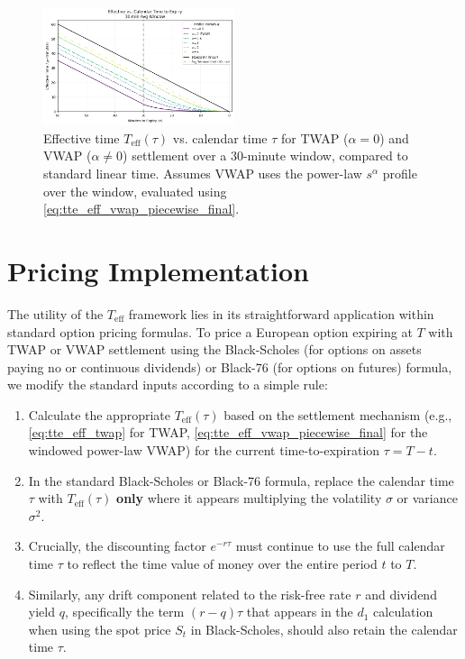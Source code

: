 \documentclass[11pt]{article}
\theoremstyle{plain}
\begin{document}
\begin{figure}[H]
    \centering
    \includegraphics[width=0.5\textwidth]{png1.png}
    \caption{Effective time $T_{\mathrm{eff}}(\tau)$ vs. calendar time $\tau$ for TWAP ($\alpha=0$) and VWAP ($\alpha \neq 0$) settlement over a 30-minute window, compared to standard linear time. Assumes VWAP uses the power-law $s^\alpha$ profile over the window, evaluated using \cref{eq:tte_eff_vwap_piecewise_final}.}
    \label{fig:Teff_vs_tau}
\end{figure}



\section{Pricing Implementation}
\label{sec:implementation}

The utility of the $T_{\mathrm{eff}}$ framework lies in its straightforward application within standard option pricing formulas. To price a European option expiring at $T$ with TWAP or VWAP settlement using the Black-Scholes (for options on assets paying no or continuous dividends) or Black-76 (for options on futures) formula, we modify the standard inputs according to a simple rule:

\begin{enumerate}
    \item Calculate the appropriate $T_{\mathrm{eff}}(\tau)$ based on the settlement mechanism (e.g., \cref{eq:tte_eff_twap} for TWAP, \cref{eq:tte_eff_vwap_piecewise_final} for the windowed power-law VWAP) for the current time-to-expiration $\tau = T-t$.
    \item In the standard Black-Scholes or Black-76 formula, replace the calendar time $\tau$ with $T_{\mathrm{eff}}(\tau)$ \textbf{only} where it appears multiplying the volatility $\sigma$ or variance $\sigma^2$.
    \item Crucially, the discounting factor $e^{-r\tau}$ must continue to use the full calendar time $\tau$ to reflect the time value of money over the entire period $t$ to $T$.
    \item Similarly, any drift component related to the risk-free rate $r$ and dividend yield $q$, specifically the term $(r-q)\tau$ that appears in the $d_1$ calculation when using the spot price $S_t$ in Black-Scholes, should also retain the calendar time $\tau$.
\end{enumerate}
\end{document}

